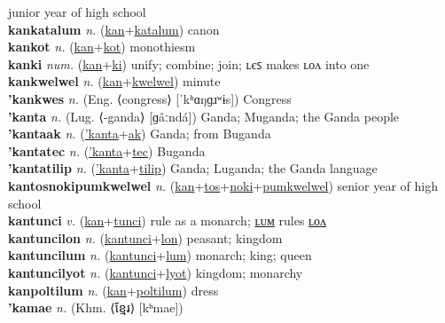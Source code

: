 junior year of high school \label{kankannokipumkwelwel} \\
\textbf{kankatalum} \textit{n.} (\hyperref[kan]{kan}+\hyperref[katalum]{katalum})
canon \label{kankatalum} \\
\textbf{kankot} \textit{n.} (\hyperref[kan]{kan}+\hyperref[kot]{kot})
monothiesm \label{kankot} \\
\textbf{kanki} \textit{num.} (\hyperref[kan]{kan}+\hyperref[ki]{ki})
unify; combine; join; ʟєꜱ makes ʟᴏᴧ into one \label{kanki} \\
\textbf{kankwelwel} \textit{n.} (\hyperref[kan]{kan}+\hyperref[kwelwel]{kwelwel})
minute \label{kankwelwel} \\
\textbf{'kankwes} \textit{n.} (Eng. ⟨congress⟩ [ˈkʰɑŋɡɹʷɨs])
Congress \label{'kankwes} \\
\textbf{'kanta} \textit{n.} (Lug. ⟨-ganda⟩ [ɡâːndá])
Ganda; Muganda; the Ganda people \label{'kanta} \\
\textbf{'kantaak} \textit{n.} (\hyperref['kanta]{'kanta}+\hyperref[ak]{ak})
Ganda; from Buganda \label{'kantaak} \\
\textbf{'kantatec} \textit{n.} (\hyperref['kanta]{'kanta}+\hyperref[tec]{tec})
Buganda \label{'kantatec} \\
\textbf{'kantatilip} \textit{n.} (\hyperref['kanta]{'kanta}+\hyperref[tilip]{tilip})
Ganda; Luganda; the Ganda language \label{'kantatilip} \\
\textbf{kantosnokipumkwelwel} \textit{n.} (\hyperref[kan]{kan}+\hyperref[tos]{tos}+\hyperref[noki]{noki}+\hyperref[pumkwelwel]{pumkwelwel})
senior year of high school \label{kantosnokipumkwelwel} \\
\textbf{kantunci} \textit{v.} (\hyperref[kan]{kan}+\hyperref[tunci]{tunci})
rule as a monarch; \hyperref[kantuncilum]{ʟᴜᴍ} rules \hyperref[kantuncilon]{ʟᴏᴧ} \label{kantunci} \\
\textbf{kantuncilon} \textit{n.} (\hyperref[kantunci]{kantunci}+\hyperref[lon]{lon})
peasant; kingdom \label{kantuncilon} \\
\textbf{kantuncilum} \textit{n.} (\hyperref[kantunci]{kantunci}+\hyperref[lum]{lum})
monarch; king; queen \label{kantuncilum} \\
\textbf{kantuncilyot} \textit{n.} (\hyperref[kantunci]{kantunci}+\hyperref[lyot]{lyot})
kingdom; monarchy \label{kantuncilyot} \\
\textbf{kanpoltilum} \textit{n.} (\hyperref[kan]{kan}+\hyperref[poltilum]{poltilum})
dress \label{kanpoltilum} \\
\textbf{'kamae} \textit{n.} (Khm. ⟨ខ្មែរ⟩ [kʰmae])
